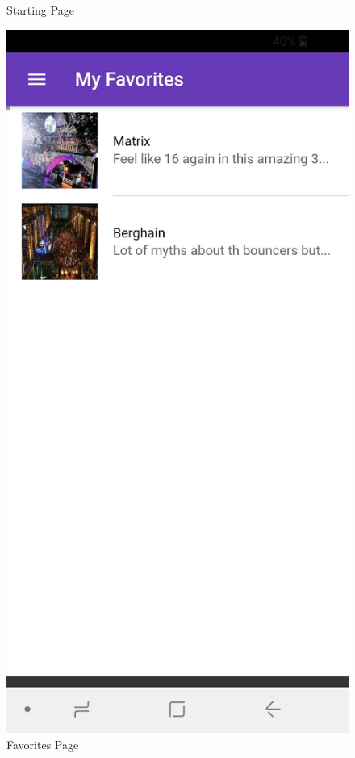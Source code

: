 \documentclass[12pt]{article}
\begin{document}
\begin{figure}[H]
  \caption{Starting Page}\label{fig:awesome_image1}
\endminipage\hfill
{}
  \includegraphics[width=\linewidth]{figures/Favorites.jpg}
  \caption{Favorites Page}\label{fig:awesome_image2}

\end{figure}
\end{document}
